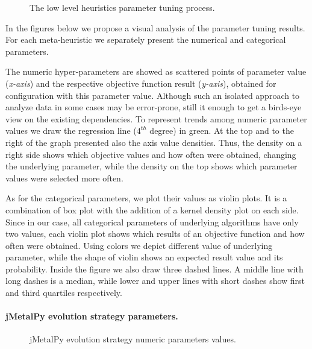 \begin{figure}[h!]
	\centering
	
	\caption{The low level heuristics parameter tuning process.}
	\label{eval:pict:mh tuning}
\end{figure}

In the figures below we propose a visual analysis of the parameter tuning results. For each meta-heuristic we separately present the numerical and categorical parameters.

The numeric hyper-parameters are showed as scattered points of parameter value (\emph{x-axis}) and the respective objective function result (\emph{y-axis}), obtained for configuration with this parameter value. Although such an isolated approach to analyze data in some cases may be error-prone, still it enough to get a birds-eye view on the existing dependencies. To represent trends among numeric parameter values we draw the regression line ($4^{th}$ degree) in green. At the top and to the right of the graph presented also the axis value densities. Thus, the density on a right side shows which objective values and how often were obtained, changing the underlying parameter, while the density on the top shows which parameter values were selected more often.

As for the categorical parameters, we plot their values as violin plots. It is a combination of box plot with the addition of a kernel density plot on each side. Since in our case, all categorical parameters of underlying algorithms have only two values, each violin plot shows which results of an objective function and how often were obtained. Using colors we depict different value of underlying parameter, while the shape of violin shows an expected result value and its probability. Inside the figure we also draw three dashed lines. A middle line with long dashes is a median, while lower and upper lines with short dashes show first and third quartiles respectively.


\paragraph{jMetalPy evolution strategy parameters.}
\begin{figure}[h!]
	\centering
	\vspace{-20pt}
	
	\caption{jMetalPy evolution strategy numeric parameters values.}
	\label{eval:pict:jmetalpy es numeric}
	\vspace{-20pt}
\end{figure}

